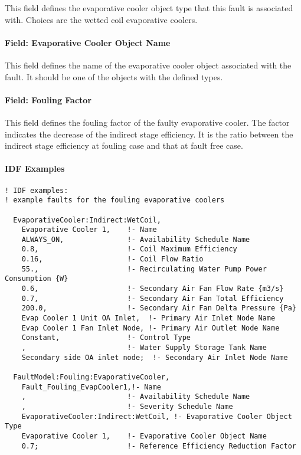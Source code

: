 This field defines the evaporative cooler object type that this fault is associated with. Choices are the wetted coil evaporative coolers.

\paragraph{Field: Evaporative Cooler Object Name}\label{field-evaporative cooler-object-name}

This field defines the name of the evaporative cooler object associated with the fault. It should be one of the objects with the defined types.

\paragraph{Field: Fouling Factor}\label{field-fouling-factor}

This field defines the fouling factor of the faulty evaporative cooler. The factor indicates the decrease of the indirect stage efficiency. It is the ratio between the indirect stage efficiency at fouling case and that at fault free case.

\paragraph{IDF Examples}

\begin{lstlisting}
! IDF examples:
! example faults for the fouling evaporative coolers

  EvaporativeCooler:Indirect:WetCoil,
    Evaporative Cooler 1,    !- Name
    ALWAYS_ON,               !- Availability Schedule Name
    0.8,                     !- Coil Maximum Efficiency
    0.16,                    !- Coil Flow Ratio
    55.,                     !- Recirculating Water Pump Power Consumption {W}
    0.6,                     !- Secondary Air Fan Flow Rate {m3/s}
    0.7,                     !- Secondary Air Fan Total Efficiency
    200.0,                   !- Secondary Air Fan Delta Pressure {Pa}
    Evap Cooler 1 Unit OA Inlet,  !- Primary Air Inlet Node Name
    Evap Cooler 1 Fan Inlet Node, !- Primary Air Outlet Node Name
    Constant,                !- Control Type
    ,                        !- Water Supply Storage Tank Name
    Secondary side OA inlet node;  !- Secondary Air Inlet Node Name

  FaultModel:Fouling:EvaporativeCooler,
    Fault_Fouling_EvapCooler1,!- Name
    ,                        !- Availability Schedule Name
    ,                        !- Severity Schedule Name
    EvaporativeCooler:Indirect:WetCoil, !- Evaporative Cooler Object Type
    Evaporative Cooler 1,    !- Evaporative Cooler Object Name
    0.7;                     !- Reference Efficiency Reduction Factor

\end{lstlisting}


